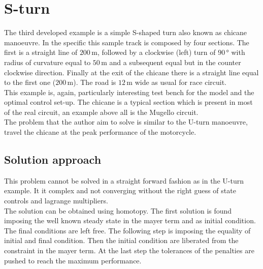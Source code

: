 \section{S-turn}
%
The third developed example is a simple S-shaped turn also known as chicane manoeuvre. In the specific this sample track is composed by four sections. The first is a straight line of $200\,\si{\metre}$, followed by a clockwise (left) turn of $90\,\si{\degree}$ with radius of curvature equal to $50\,\si{\metre}$ and a subsequent equal but in the counter clockwise direction. Finally at the exit of the chicane there is a straight line equal to the first one ($200\,\si{\metre}$). The road is $12\,\si{\metre}$ wide as usual for race circuit.\\
This example is, again, particularly interesting test bench for the model and the optimal control set-up. The chicane is a typical section which is present in most of the real circuit, an example above all is the Mugello circuit.\\
The problem that the author aim to solve is similar to the U-turn manoeuvre, travel the chicane at the peak performance of the motorcycle.
%
\subsection{Solution approach}
%
This problem cannot be solved in a straight forward fashion as in the U-turn example. It it complex and not converging without the right guess of state controls and lagrange multipliers.\\
The solution can be obtained using homotopy. The first solution is found imposing the well known steady state in the mayer term and as initial condition. The final conditions are left free. The following step is imposing the equality of initial and final condition. Then the initial condition are liberated from the constraint in the mayer term. At the last step the tolerances of the penalties are pushed to reach the maximum performance.
%
